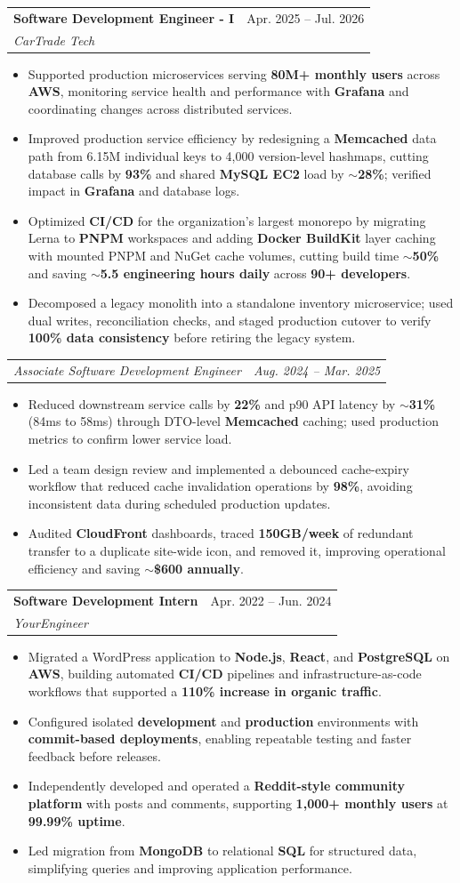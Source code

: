 \documentclass[letterpaper,11pt]{article}
\makeatletter
\newcommand{\resumeItem}[1]{
  \item\small{
    {#1 \vspace{-2pt}}
  }
}
\newcommand{\resumeSubheading}[4]{
  \vspace{-2pt}\item
    \begin{tabular*}{0.97\textwidth}[t]{l@{\extracolsep{\fill}}r}
      \textbf{#1} & #2 \\
      \textit{\small#3} & \textit{\small #4} \\
    \end{tabular*}\vspace{-7pt}
}
\newcommand{\resumeSubSubheading}[2]{
    \item
    \begin{tabular*}{0.97\textwidth}{l@{\extracolsep{\fill}}r}
      \textit{\small#1} & \textit{\small #2} \\
    \end{tabular*}\vspace{-7pt}
}
\newcommand{\resumeItemListStart}{\begin{itemize}}
\newcommand{\resumeItemListEnd}{\end{itemize}\vspace{-5pt}}
\makeatother
\begin{document}
\resumeSubheading
{Software Development Engineer - I}{Apr. 2025 -- Jul. 2026}
{CarTrade Tech}{ }
\resumeItemListStart
\resumeItem{Supported production microservices serving \textbf{80M+ monthly users} across \textbf{AWS}, monitoring service health and performance with \textbf{Grafana} and coordinating changes across distributed services.}
\resumeItem{Improved production service efficiency by redesigning a \textbf{Memcached} data path from 6.15M individual keys to 4,000 version-level hashmaps, cutting database calls by \textbf{93\%} and shared \textbf{MySQL EC2} load by \textbf{$\sim$28\%}; verified impact in \textbf{Grafana} and database logs.}
\resumeItem{Optimized \textbf{CI/CD} for the organization's largest monorepo by migrating Lerna to \textbf{PNPM} workspaces and adding \textbf{Docker BuildKit} layer caching with mounted PNPM and NuGet cache volumes, cutting build time \textbf{$\sim$50\%} and saving \textbf{$\sim$5.5 engineering hours daily} across \textbf{90+ developers}.}
\resumeItem{Decomposed a legacy monolith into a standalone inventory microservice; used dual writes, reconciliation checks, and staged production cutover to verify \textbf{100\% data consistency} before retiring the legacy system.}
\resumeItemListEnd
\resumeSubSubheading
{Associate Software Development Engineer}{Aug. 2024 -- Mar. 2025}
\resumeItemListStart
\resumeItem{Reduced downstream service calls by \textbf{22\%} and p90 API latency by \textbf{$\sim$31\%} (84ms to 58ms) through DTO-level \textbf{Memcached} caching; used production metrics to confirm lower service load.}
\resumeItem{Led a team design review and implemented a debounced cache-expiry workflow that reduced cache invalidation operations by \textbf{98\%}, avoiding inconsistent data during scheduled production updates.}
\resumeItem{Audited \textbf{CloudFront} dashboards, traced \textbf{150GB/week} of redundant transfer to a duplicate site-wide icon, and removed it, improving operational efficiency and saving \textbf{$\sim$\$600 annually}.}
\resumeItemListEnd

\resumeSubheading
{Software Development Intern}{Apr. 2022 -- Jun. 2024}
{YourEngineer}{ }
\resumeItemListStart
\resumeItem{Migrated a WordPress application to \textbf{Node.js}, \textbf{React}, and \textbf{PostgreSQL} on \textbf{AWS}, building automated \textbf{CI/CD} pipelines and infrastructure-as-code workflows that supported a \textbf{110\% increase in organic traffic}.}
\resumeItem{Configured isolated \textbf{development} and \textbf{production} environments with \textbf{commit-based deployments}, enabling repeatable testing and faster feedback before releases.}
\resumeItem{Independently developed and operated a \textbf{Reddit-style community platform} with posts and comments, supporting \textbf{1,000+ monthly users} at \textbf{99.99\% uptime}.}
\resumeItem{Led migration from \textbf{MongoDB} to relational \textbf{SQL} for structured data, simplifying queries and improving application performance.}
\resumeItemListEnd
\end{document}
